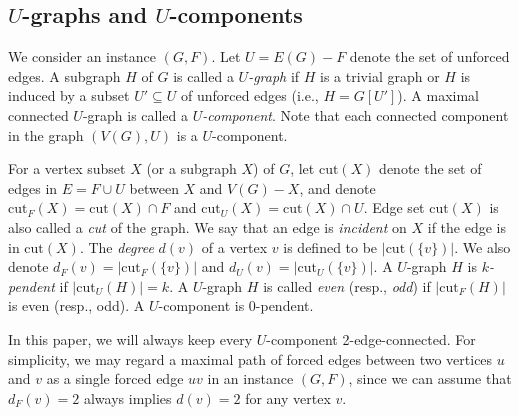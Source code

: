 \documentclass[runningheads]{llncs}
\begin{document}
\subsection{$U$-graphs and $U$-components}
We consider an instance $(G,F)$. Let $U=E(G)-F$ denote the set of unforced edges.
A subgraph $H$ of $G$ is called a \emph{$U$-graph} if $H$ is a trivial graph or $H$ is
induced by a subset $U'\subseteq U$ of unforced edges (i.e., $H=G[U']$). A maximal connected $U$-graph is called a \emph{$U$-component}.
Note that each connected component in the graph $(V(G),U)$ is a $U$-component.

For a vertex subset $X$ (or a subgraph $X$) of $G$,
let $\mathrm{cut}(X)$ denote the set of edges in $E=F\cup U$
between $X$ and $V(G)-X$,
and denote  $\mathrm{cut}_F(X)=\mathrm{cut}(X)\cap F$
and $\mathrm{cut}_U(X)=\mathrm{cut}(X)\cap U$. Edge set $\mathrm{cut}(X)$ is also called a \emph{cut} of the graph.
We say that an edge is \emph{incident} on $X$ if the edge is in $\mathrm{cut}(X)$.
The {\em degree} $d(v)$ of a vertex $v$ is defined to be
$|\mathrm{cut}(\{v\})|$.
We also denote $d_F(v)=|\mathrm{cut}_F(\{v\})|$
and $d_U(v)=|\mathrm{cut}_U(\{v\})|$.
A $U$-graph $H$ is {\em $k$-pendent} if $|\mathrm{cut}_U(H)|=k$.
A  $U$-graph $H$ is called  {\em even} (resp., {\em odd}) if  $|\mathrm{cut}_F (H)|$ is even (resp., odd).
A $U$-component is 0-pendent.

In this paper, we will always keep every $U$-component 2-edge-connected.
For simplicity, we may regard a maximal path of
forced edges between two vertices $u$ and $v$
as a single forced edge $uv$ in an instance $(G,F)$, since we can assume that
 $d_F(v)= 2$ always implies $d(v)=2$ for any vertex $v$.
\end{document}
